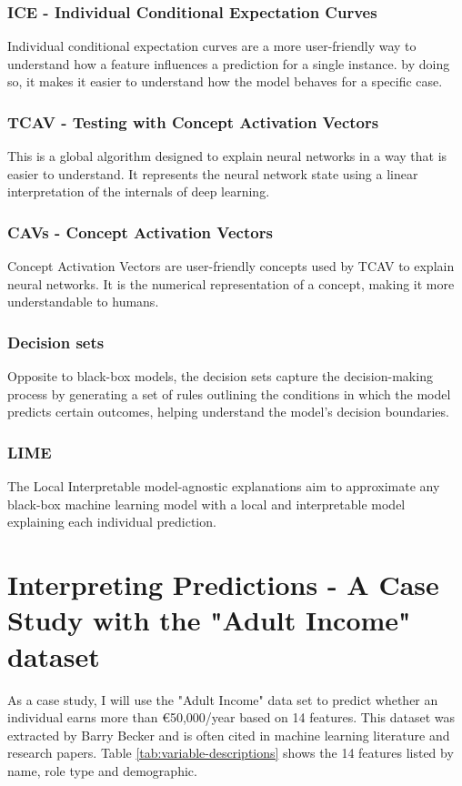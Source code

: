 \documentclass[10pt,journal,compsoc]{IEEEtran}
\begin{document}
\subsubsection{ICE - Individual Conditional Expectation Curves}
Individual conditional expectation curves are a more user-friendly way to understand how a feature influences a prediction for a single instance. by doing so, it makes it easier to understand how the model behaves for a specific case.

\subsubsection{TCAV - Testing with Concept Activation Vectors}
This is a global algorithm designed to explain neural networks in a way that is easier to understand. It represents the neural network state using a linear interpretation of the internals of deep learning.

\subsubsection{CAVs - Concept Activation Vectors}
Concept Activation Vectors are user-friendly concepts used by TCAV to explain neural networks. It is the numerical representation of a concept, making it more understandable to humans.

\subsubsection{Decision sets}
Opposite to black-box models, the decision sets capture the decision-making process by generating a set of rules outlining the conditions in which the model predicts certain outcomes, helping understand the model's decision boundaries.

\subsubsection{LIME }
The Local Interpretable model-agnostic explanations aim to approximate any black-box machine learning model with a local and interpretable model explaining each individual prediction.

\section{Interpreting Predictions - A Case Study with the "Adult Income" dataset}
As a case study, I will use the "Adult Income" data set\cite{misc_adult_2} to predict whether an individual earns more than €50,000/year based on 14 features. This dataset was extracted by Barry Becker and is often cited in machine learning literature and research papers.
Table \ref{tab:variable-descriptions} shows the 14 features listed by name, role type and demographic.
\end{document}
